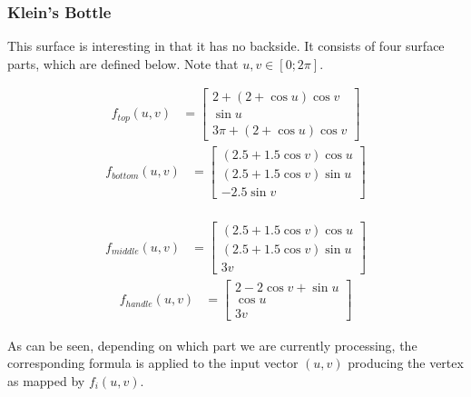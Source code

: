\documentclass[11pt]{article}
\begin{document}
\subsubsection{Klein's Bottle}
This surface is interesting in that it has no backside. It consists of four
surface parts, which are defined below. Note that $u, v \in [0;2\pi]$.
\vspace{-0.25in}
\begin{multicols}{2}
    \begin{align*}
        f_{top}(u,v) &=
        \begin{bmatrix}
            2 + (2 + \cos u) \cos v \\
            \sin u \\
            3\pi + (2 + \cos u) \cos v
        \end{bmatrix}
    \end{align*}
    \begin{align*}
        f_{bottom}(u,v) &=
        \begin{bmatrix}
            (2.5 + 1.5 \cos v) \cos u \\
            (2.5 + 1.5 \cos v) \sin u \\
            -2.5 \sin v
        \end{bmatrix}
    \end{align*}
    \vfill\columnbreak
    {\ }\vspace{-0.25in}
    \begin{align*}
        f_{middle}(u,v) &=
        \begin{bmatrix}
            (2.5 + 1.5 \cos v) \cos u \\
            (2.5 + 1.5 \cos v) \sin u \\
            3 v
        \end{bmatrix}
    \end{align*}
    \vspace{-0.5in}
    \begin{align*}
        f_{handle}(u,v) &=
        \begin{bmatrix}
            2 - 2 \cos v + \sin u \\
            \cos u \\
            3 v
        \end{bmatrix}
    \end{align*}
    \vfill
\end{multicols}

As can be seen, depending on which part we are currently processing, the
corresponding formula is applied to the input vector $(u,v)$ producing the
vertex as mapped by $f_i(u,v)$.
\end{document}
